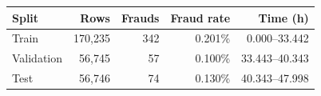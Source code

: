 \begin{tabular}{lrrrr}
\toprule
Split & Rows & Frauds & Fraud rate & Time (h) \\
\midrule
Train & 170,235 & 342 & 0.201\% & 0.000--33.442 \\
Validation & 56,745 & 57 & 0.100\% & 33.443--40.343 \\
Test & 56,746 & 74 & 0.130\% & 40.343--47.998 \\
\bottomrule
\end{tabular}
